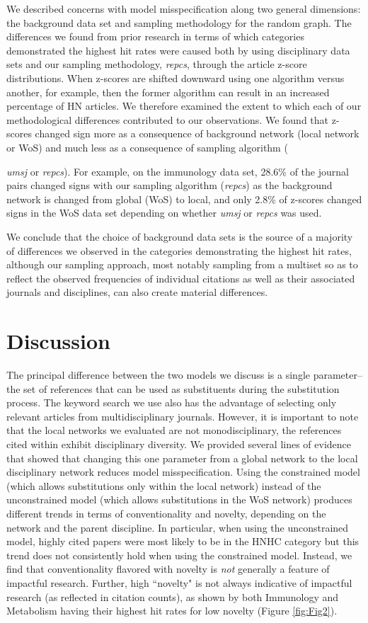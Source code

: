 \documentclass[NETN]{stjour}
\begin{document}
We described concerns with model misspecification along two general dimensions: the background data set and sampling methodology for the random graph. The differences we found from prior research in terms of which categories demonstrated the highest hit rates were caused both by using disciplinary data sets and our sampling methodology, \textit{repcs},  through the article z-score distributions. 
When z-scores are shifted downward using one algorithm versus another, for example, then the former algorithm can result in an increased percentage of HN articles.
We therefore examined  the extent to which each of our methodological differences contributed to our observations.  
We found that z-scores changed sign more as a consequence of background network (local network or WoS) and much less as a consequence of sampling algorithm
 ({\textit{umsj} or \textit{repcs}). 
For example,  on the immunology data set, 28.6\% of the journal pairs changed signs with our sampling algorithm (\textit{repcs}) as the background network is changed from global (WoS) to local, and 
only 2.8\% of z-scores changed signs in the WoS data set depending on whether 
\textit{umsj} or \textit{repcs} was used. 

We conclude that the choice of background data sets is the source of a majority of differences we observed in the categories demonstrating the highest hit rates, although our sampling approach, most notably sampling from a multiset so as to reflect the observed frequencies of individual citations as well as their associated journals and disciplines, can also create material differences.  

\section{Discussion}

The principal difference between the two models we discuss is a single parameter--the set of references that can be used as substituents during the substitution process. The keyword search we use also has the advantage of selecting only relevant articles from multidisciplinary journals. However, it is important to note that the local networks we evaluated are not monodisciplinary, the references cited within exhibit disciplinary diversity. We provided several lines of evidence that showed that changing this one parameter from a global network to the local disciplinary network reduces model misspecification. Using the constrained model (which allows substitutions only within the local network)  instead of the unconstrained model (which allows substitutions in the WoS network) produces different trends in terms of conventionality and novelty, depending on the network and the parent discipline. In particular, when using the unconstrained model, highly cited papers were most likely to be in the HNHC category but this trend does not consistently hold when using the constrained model. Instead, we find that conventionality flavored with novelty is {\em not} generally a feature of impactful research. Further,  high ``novelty" is not always indicative of impactful research (as reflected in citation counts), as shown by both Immunology and Metabolism having their highest hit rates for low novelty (Figure \ref{fig:Fig2}). 

}
\end{document}
